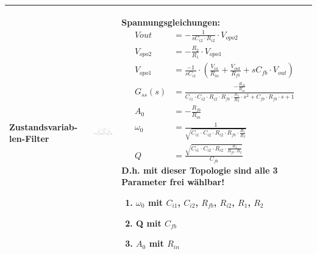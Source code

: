 \begin{longtable}{|>{\bfseries}p{3cm}|c|p{10cm}|}
      {Zustandsvariab-len-Filter
      }
      & \includegraphics[width=4cm, valign=t]{./pictures/zustandsvariable.png}
      & {Spannungsgleichungen:\newline
         \begin{align*}
             V{out}		&=-\frac{1}{s C_{i2}\cdot R_{i2}}\cdot V_{opo2}\\
             V_{opo2}	&=-\frac{R_2}{R_1}\cdot V_{opo1}\\
             V_{opo1}	&=\frac{-1}{s C_{i1}}\cdot \left(\frac{V_{in}}{R_{in}}+
             \frac{V_{out}}{R_{fb}}+s C_{fb}\cdot V_{out}\right)\\
             G_{ss}(s)	&=\frac{-\frac{R_{fb}}{R_{in}}}{C_{i1}\cdot C_{i2}\cdot R_{i2}\cdot
             R_{fb}\cdot \frac{R_1}{R_2}\cdot s^2+C_{fb}\cdot R_{fb}\cdot s+1}\\
             A_{0}		&=-\frac{R_{fb}}{R_{in}}\\
             \omega_{0}	&=\frac{1}{\sqrt{C_{i1}\cdot C_{i2}\cdot R_{i2}\cdot R_{fb}\cdot \frac{R_1}{R_2}}}\\
             Q			&=\frac{\sqrt{C_{i1}\cdot C_{i2}\cdot R_{i2}\cdot \frac{R_1}{R_{fb}\cdot R_2}}}{C_{fb}}
         \end{align*}
         D.h. mit dieser Topologie sind alle 3 Parameter frei wählbar!
         \begin{enumerate}
             \item $\omega_{0}$ mit $C_{i1}$, $C_{i2}$, $R_{fb}$, $R_{i2}$, $R_1$, $R_2$
             \item Q mit $C_{fb}$
             \item $A_0$ mit $R_{in}$
         \end{enumerate}
        }
      \\ \hline
\end{longtable}


